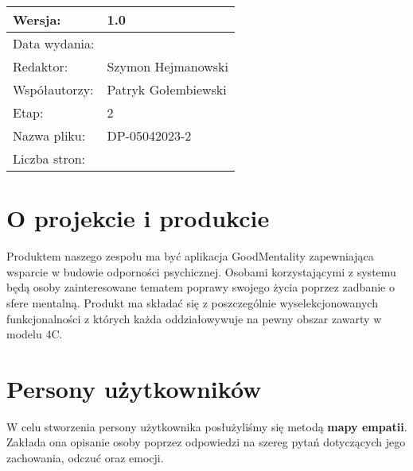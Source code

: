 \documentclass[12pt, letterpaper]{article}
\begin{document}
\begin{titlepage}
\begin{center}
            \begin{tabular}{ | m{} | m{}|  } 
                \hline
                Wersja: & 1.0 \\ %
                \hline
                Data wydania: & \date{\today} \\ %
                \hline
                Redaktor: & Szymon Hejmanowski \\ %
                \hline
                Współautorzy: & Patryk Gołembiewski \\ %
                \hline
                Etap: & 2 \\ %
                \hline
                Nazwa pliku: & DP-05042023-2 \\ %
                \hline
                Liczba stron: & \\ %
                \hline
                \end{tabular}
        \end{center}    
    \end{titlepage}

    \tableofcontents

    \pagebreak

    \section{O projekcie i produkcie}
    Produktem naszego zespołu ma być aplikacja GoodMentality zapewniająca wsparcie 
    w budowie odporności psychicznej. Osobami korzystającymi z systemu będą
    osoby zainteresowane tematem poprawy swojego życia poprzez zadbanie o sfere
    mentalną. Produkt ma składać się z poszczególnie wyselekcjonowanych funkcjonalności
    z których każda oddziałowywuje na pewny obszar zawarty w modelu 4C.


    \section{Persony użytkowników}
    W celu stworzenia persony użytkownika posłużyliśmy się metodą \textbf{mapy empatii}. Zakłada
    ona opisanie osoby poprzez odpowiedzi na szereg pytań dotyczących jego zachowania, 
    odczuć oraz emocji. \\
\end{document}
